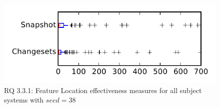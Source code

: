 
\begin{figure}
\centering
\includegraphics[height=0.4\textheight]{figures/flt_seed/rq1_tiny_38}
\caption{RQ 3.3.1: Feature Location effectiveness measures for all subject systems with $seed=38$}
\label{fig:flt_seed:rq1:tiny}
\end{figure}
